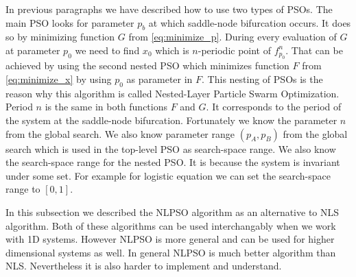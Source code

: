 \par
In previous paragraphs we have described how to use two types of PSOs. 
The main PSO looks for parameter $p_b$ at which saddle-node bifurcation occurs.
It does so by minimizing function $G$ from \ref{eq:minimize_p}.
During every evaluation of $G$ at parameter $p_0$ we need to find $x_0$ which is $n$-periodic point of $f^{n}_{p_0}$.
That can be achieved by using the second nested PSO which minimizes function $F$ from \ref{eq:minimize_x} by using $p_0$ as parameter in $F$.
This nesting of PSOs is the reason why this algorithm is called Nested-Layer Particle Swarm Optimization.
Period $n$ is the same in both functions $F$ and $G$.
It corresponds to the period of the system at the saddle-node bifurcation.
Fortunately we know the parameter $n$ from the global search.
We also know parameter range $(p_A, p_B)$ from the global search which is used in the top-level PSO as search-space range.
We also know the search-space range for the nested PSO.
It is because the system is invariant under some set.
For example for logistic equation we can set the search-space range to $[0, 1]$.
\par
In this subsection we described the NLPSO algorithm as an alternative to NLS algorithm.
Both of these algorithms can be used interchangably when we work with 1D systems.
However NLPSO is more general and can be used for higher dimensional systems as well.
In general NLPSO is much better algorithm than NLS.
Nevertheless it is also harder to implement and understand.


